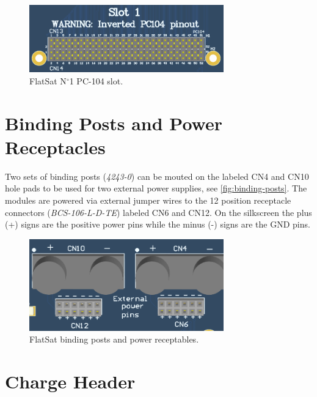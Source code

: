 \begin{figure}[!ht]
    \begin{center}
        \includegraphics[width=0.75\textwidth]{figures/pc104_slot_n1.png}
        \caption{FlatSat N$^{\circ}$1 PC-104 slot.}
        \label{fig:n1-slot}
    \end{center}
\end{figure}

\section{Binding Posts and Power Receptacles}

Two sets of binding posts (\textit{4243-0}) can be mouted on the labeled CN4 and CN10 hole pads to be used for two external power supplies, see \autoref{fig:binding-posts}. The modules are powered via external jumper wires to the 12 position receptacle connectors (\textit{BCS-106-L-D-TE}) labeled CN6 and CN12. On the silkscreen the plus (+) signs are the positive power pins while the minus (-) signs are the GND pins.

\begin{figure}[!ht]
    \begin{center}
        \includegraphics[width=0.75\textwidth]{figures/binding_posts.png}
        \caption{FlatSat binding posts and power receptables.}
        \label{fig:binding-posts}
    \end{center}
\end{figure}

\section{Charge Header}

